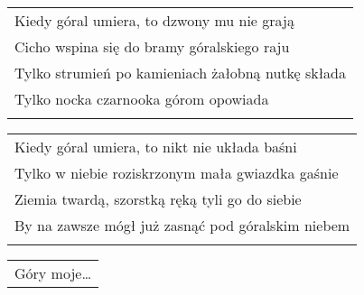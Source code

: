 \documentclass[a5paper]{article}
\begin{document}
\noindent
\begin{tabular}{@{}p{9.5cm}@{}}
Kiedy góral umiera, to dzwony mu nie grają \\
Cicho wspina się do bramy góralskiego raju \\
Tylko strumień po kamieniach żałobną nutkę składa \\
Tylko nocka czarnooka górom opowiada \\ \\
\end{tabular}

\noindent
\begin{tabular}{@{}p{9.5cm}@{}}
Kiedy góral umiera, to nikt nie układa baśni \\
Tylko w niebie roziskrzonym mała gwiazdka gaśnie \\
Ziemia twardą, szorstką ręką tyli go do siebie \\
By na zawsze mógł już zasnąć pod góralskim niebem \\ \\
\end{tabular}

\noindent
\begin{tabular}{@{}p{8.5cm}@{}}
Góry moje…
\end{tabular}
\end{document}

